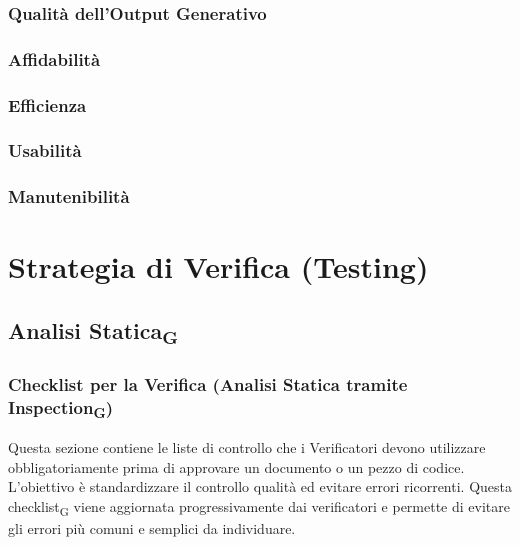 \documentclass[11pt,a4paper]{article}
\begin{document}
\subsubsection{Qualità dell'Output Generativo}

\subsubsection{Affidabilità}

\subsubsection{Efficienza}

\subsubsection{Usabilità}

\subsubsection{Manutenibilità}


\newpage
\section{Strategia di Verifica (Testing)}
\subsection{Analisi Statica\textsubscript{G}}

\subsubsection{Checklist per la Verifica (Analisi Statica tramite Inspection\textsubscript{G})}
Questa sezione contiene le liste di controllo che i Verificatori devono utilizzare obbligatoriamente prima di approvare un documento o un pezzo di codice. L'obiettivo è standardizzare il controllo qualità ed evitare errori ricorrenti.
Questa checklist\textsubscript{G} viene aggiornata progressivamente dai verificatori e permette di evitare gli errori più comuni e semplici da individuare.
\end{document}
